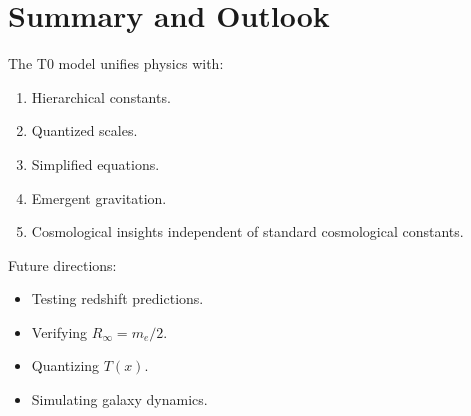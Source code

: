 \documentclass[12pt,a4paper]{article}
\newcommand{\Tfield}{T(x)}
\begin{document}
	\section{Summary and Outlook}
	\label{sec:outlook}
	
	The T0 model unifies physics with:
	\begin{enumerate}
		\item Hierarchical constants.
		\item Quantized scales.
		\item Simplified equations.
		\item Emergent gravitation.
		\item Cosmological insights independent of standard cosmological constants.
	\end{enumerate}
	
	Future directions:
	\begin{itemize}
		\item Testing redshift predictions.
		\item Verifying \(R_\infty = m_e/2\).
		\item Quantizing \(\Tfield\).
		\item Simulating galaxy dynamics.
	\end{itemize}
	
\end{document}
